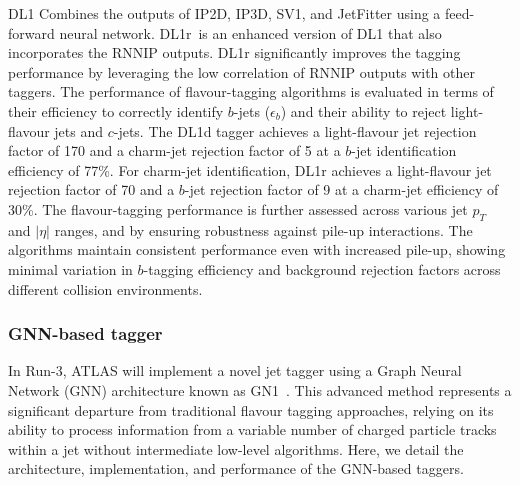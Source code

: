             DL1 Combines the outputs of IP2D, IP3D, SV1, and JetFitter using a feed-forward neural network.
            DL1r~\cite{ATL-PHYS-PUB-2017-013}is an enhanced version of DL1 that also incorporates the RNNIP outputs. DL1r significantly improves the tagging performance by 
            leveraging the low correlation of RNNIP outputs with other taggers.
            The performance of flavour-tagging algorithms is evaluated in terms of their efficiency to correctly identify \(b\)-jets (\(\epsilon_b\)) 
            and their ability to reject light-flavour jets and \(c\)-jets. The DL1d tagger achieves a light-flavour jet rejection factor of 170 and 
            a charm-jet rejection factor of 5 at a \(b\)-jet identification 
            efficiency of 77\%. For charm-jet identification, DL1r achieves a light-flavour jet rejection factor of 70 and a \(b\)-jet rejection 
            factor of 9 at a charm-jet efficiency of 30\%. The flavour-tagging performance is further assessed across various jet \(p_T\) and \(|\eta|\) 
            ranges, and by ensuring robustness against pile-up interactions. The algorithms maintain consistent performance even with increased pile-up, 
            showing minimal variation in \(b\)-tagging efficiency and background rejection factors across different collision environments.
        
        \subsubsection{GNN-based tagger}
            In Run-3, ATLAS will implement a novel jet tagger using a Graph Neural Network (GNN) architecture known as GN1~\cite{ATL-PHYS-PUB-2022-027, ATL-PHYS-PUB-2023-021}. This advanced method 
            represents a significant departure from traditional flavour tagging approaches, relying on its ability to process information from a 
            variable number of charged particle tracks within a jet without intermediate low-level algorithms. Here, we detail the architecture, 
            implementation, and performance of the GNN-based taggers.
        
